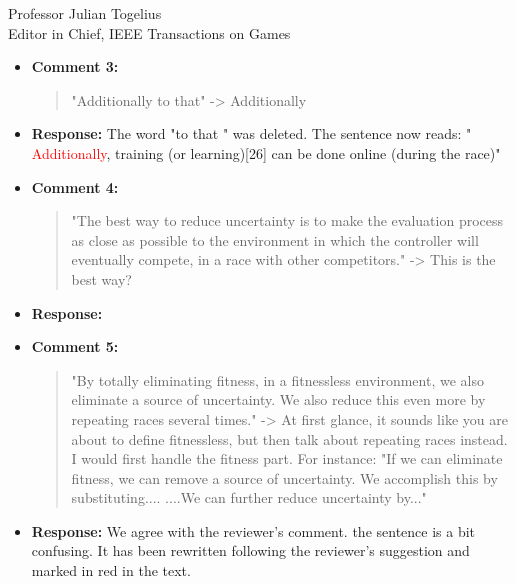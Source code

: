 \documentclass[10pt]{letter} %
\begin{document}
\begin{letter}{Professor Julian Togelius \\ Editor in Chief, IEEE Transactions on Games}
\begin{enumerate}
\begin{itemize}
		\item {\bf Comment 3:}
			\begin{quote}
				"Additionally to that" -> Additionally
			\end{quote}	
		\item {\bf Response:} 
			The word "to that "  was deleted. The sentence now reads:
			"\textcolor{red}{
				Additionally}, training (or learning)[26] can be done online (during the race)"
		\item {\bf Comment 4:}
			\begin{quote}
				"The best way to reduce uncertainty is to make the evaluation process as close as possible to the environment in which the controller will eventually compete, in a race with other competitors." -> This is the best way?
			\end{quote}	
		\item {\bf Response:} 
		\item {\bf Comment 5:}
			\begin{quote}
				"By totally eliminating fitness, in a fitnessless environment, we also eliminate a source of uncertainty. We also reduce this even more by repeating races several times." -> At first glance, it sounds like you are about to define fitnessless, but then talk about repeating races instead. I would first handle the fitness part. For instance: "If we can eliminate fitness, we can remove a source of uncertainty. We accomplish this by substituting.... ....We can further reduce uncertainty by..."
			\end{quote}	
		\item {\bf Response:} 
				We agree with the reviewer's comment. the sentence is a bit confusing. It has been rewritten following the reviewer's suggestion and marked in red in the text.
				

\end{itemize}
\end{enumerate}
\end{letter}
\end{document}
